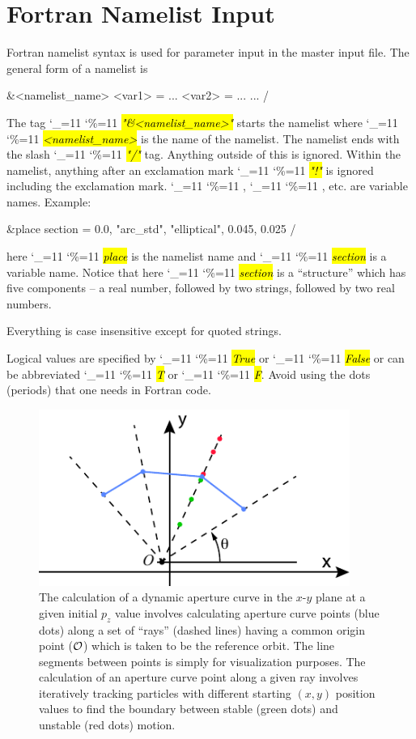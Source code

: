 \documentclass{hitec}
\newcommand\dottcmd[1]{\hl{\em#1}\endgroup}
\newcommand{\vn}{\begingroup\catcode`\_=11 \catcode`\%=11 \dottcmd}
\newcommand{\Section}[1]{\section{#1}\vspace*{-1ex}}
\begin{document}
\Section{Fortran Namelist Input}
\label{s:namelist}

Fortran namelist syntax is used for parameter input in the master input file. The general form of a namelist is
\begin{code}
&<namelist_name>
  <var1> = ...
  <var2> = ...
  ...
/
\end{code}
The tag \vn{"\&<namelist_name>"} starts the namelist where \vn{<namelist_name>} is the name of the
namelist. The namelist ends with the slash \vn{"/"} tag. Anything outside of this is ignored. Within
the namelist, anything after an exclamation mark \vn{"!"} is ignored including the exclamation
mark. \vn{<var1>}, \vn{<var2>}, etc. are variable names. Example:
\begin{code}
&place 
  section = 0.0, "arc_std", "elliptical", 0.045, 0.025 
/
\end{code}
here \vn{place} is the namelist name and \vn{section} is a variable name.  Notice that here
\vn{section} is a ``structure'' which has five components -- a real number, followed by two strings,
followed by two real numbers.

Everything is case insensitive except for quoted strings.

Logical values are specified by \vn{True} or \vn{False} or can be abbreviated \vn{T} or
\vn{F}. Avoid using the dots (periods) that one needs in Fortran code.

\clearpage

\begin{figure}[tb]
  \centering
  \includegraphics[width=4in]{aperture-rays.pdf}
  \caption{
The calculation of a dynamic aperture curve in the $x$-$y$ plane at a given initial $p_z$ value
involves calculating aperture curve points (blue dots) along a set of ``rays'' (dashed lines) having
a common origin point ($\cal O$) which is taken to be the reference orbit. The line segments between
points is simply for visualization purposes. The calculation of an aperture curve point along a
given ray involves iteratively tracking particles with different starting $(x, y)$ position values
to find the boundary between stable (green dots) and unstable (red dots) motion.
  }
  \label{f:da-ray}
\end{figure}
\end{document}
